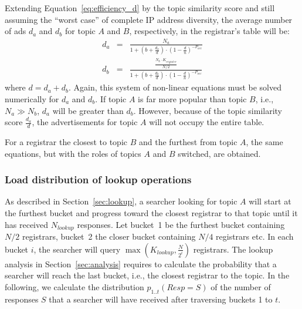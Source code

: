 Extending Equation~\ref{eq:efficiency_d} by the topic similarity score and still assuming the ``worst case'' of complete IP address diversity, the average number of ads $d_a$ and $d_b$ for topic $A$ and $B$, respectively, in the registrar's table will be:
\begin{eqnarray}
d_a & = & \frac{N_a}{1 + (b + \frac{d_a}{d}) \cdot (1 - \frac{d}{n})^{-P_{occ}}}\label{eq:da_fair}\\
d_b & = & \frac{\frac{N_b\cdot K_{register}}{N/2}}{1 + (b + \frac{d_b}{d}) \cdot (1 - \frac{d}{n})^{-P_{occ}}}\label{eq:da_fair2}
\end{eqnarray}
where $d = d_a + d_b$. Again, this system of non-linear equations must be solved numerically for $d_a$ and $d_b$.
If topic $A$ is far more popular than topic $B$, i.e., $N_a \gg N_b$, $d_a$ will be greater than $d_b$. However, because of the topic similarity score $\frac{d_a}{d}$, the advertisements for topic $A$ will not occupy the entire table.

For a registrar the closest to topic $B$ and the furthest from topic $A$, the same equations, but with the roles of topics $A$ and $B$ switched, are obtained.

\subsubsection{Load distribution of lookup operations}

As described in Section~\ref{sec:lookup}, a searcher looking for topic $A$ will start at the furthest bucket and progress toward the closest registrar to that topic until it has received $N_{lookup}$ responses.
Let bucket~1 be the furthest bucket containing $N/2$ registrars, bucket~2 the closer bucket containing $N/4$ registrars etc. In each bucket $i$, the searcher will query $\max(K_{lookup}, \frac{N}{2^i})$ registrars.
The lookup analysis in Section~\ref{sec:analysis} requires to calculate the probability that a searcher will reach the last bucket, i.e., the closest registrar to the topic. In the following, we calculate the distribution $p_{1..t}(Resp=S)$ of the number of responses $S$ that a searcher will have received after traversing buckets 1 to $t$.

